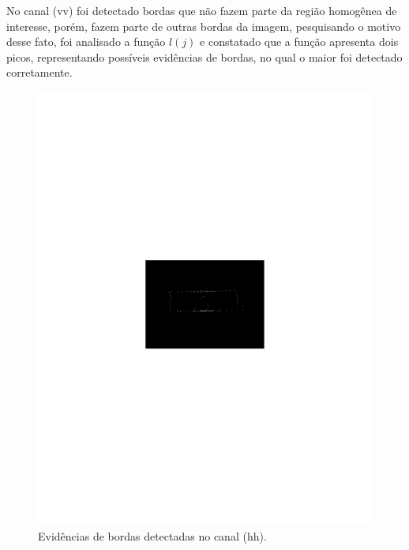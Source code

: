\documentclass[conference]{IEEEtran}
\begin{document}
No canal (vv) foi detectado bordas que não fazem parte da região homogênea de interesse, porém, fazem parte de outras bordas da imagem, pesquisando o motivo desse fato, foi analisado a função $l(j)$ e constatado que a função apresenta dois picos, representando possíveis evidências de bordas, no qual o maior foi detectado corretamente. 
\begin{figure}[hbt]
	\includegraphics[scale=0.75]{flevoland_hh_evid_crop.pdf}
		\vspace{-6.0cm}
	\caption{Evidências de bordas detectadas no canal (hh).}
\label{fig_02}
\end{figure}
\end{document}
